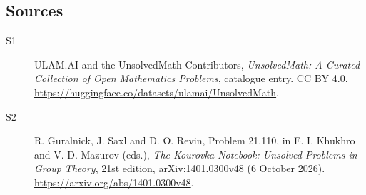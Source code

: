 \documentclass[11pt]{article}
\begin{document}
\subsection{Sources}
\begin{description}
\item[\hypertarget{source:statement:1}{S1}] ULAM.AI and the UnsolvedMath Contributors, \emph{UnsolvedMath: A Curated Collection of Open Mathematics Problems}, catalogue entry. CC BY 4.0. \url{https://huggingface.co/datasets/ulamai/UnsolvedMath}.
\item[\hypertarget{source:statement:2}{S2}] R. Guralnick, J. Saxl and D. O. Revin, Problem 21.110, in E. I. Khukhro and V. D. Mazurov (eds.), \emph{The Kourovka Notebook: Unsolved Problems in Group Theory}, 21st edition, arXiv:1401.0300v48 (6 October 2026). \url{https://arxiv.org/abs/1401.0300v48}.
\end{description}
\label{end:statement}
\end{document}
